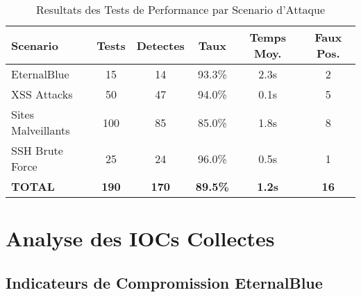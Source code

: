 \begin{table}[H]
  \centering
  \caption{Resultats des Tests de Performance par Scenario d'Attaque}
  \begin{tabular}{|l|c|c|c|c|c|}
    \hline
    \textbf{Scenario}  & \textbf{Tests} & \textbf{Detectes} & \textbf{Taux}   & \textbf{Temps Moy.} & \textbf{Faux Pos.} \\
    \hline
    EternalBlue        & 15             & 14                & 93.3\%          & 2.3s                & 2                  \\
    \hline
    XSS Attacks        & 50             & 47                & 94.0\%          & 0.1s                & 5                  \\
    \hline
    Sites Malveillants & 100            & 85                & 85.0\%          & 1.8s                & 8                  \\
    \hline
    SSH Brute Force    & 25             & 24                & 96.0\%          & 0.5s                & 1                  \\
    \hline
    \textbf{TOTAL}     & \textbf{190}   & \textbf{170}      & \textbf{89.5\%} & \textbf{1.2s}       & \textbf{16}        \\
    \hline
  \end{tabular}
\end{table}

\section{Analyse des IOCs Collectes}

\subsection{Indicateurs de Compromission EternalBlue}


